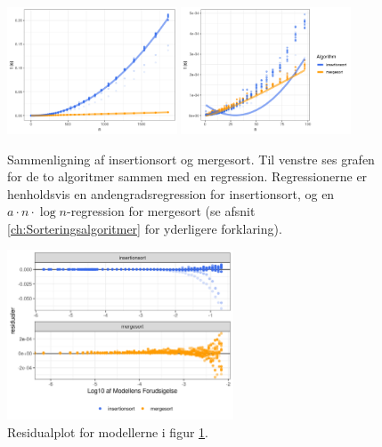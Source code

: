 \begin{figure} \centering
	\includegraphics[width=0.45\textwidth]{../img/toAlgoritmer.png}
	\includegraphics[width=0.45\textwidth]{../img/toAlgoritmerZoomed}
	\caption{Sammenligning af insertionsort og mergesort. Til venstre ses grafen for de to algoritmer sammen med en regression. Regressionerne er henholdsvis en andengradsregression for insertionsort, og en $a \cdot n \cdot \log n$-regression for mergesort (se afsnit \ref{ch:Sorteringsalgoritmer} for yderligere forklaring).}
	\label{fig:plot - to algoritmer}
\end{figure}

\begin{figure}
	\begin{center}
		\includegraphics[width=0.6\textwidth]{../img/toAlgoritmerResidual.png}
	\end{center}
	\caption{Residualplot for modellerne i figur \ref{fig:plot - to algoritmer}.}
	\label{fig:toAlgoritmerResidual}
\end{figure}



